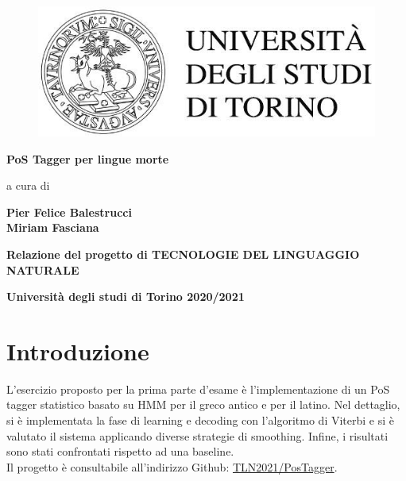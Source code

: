\documentclass[12pt]{article}
\begin{document}
\begin{figure}[h!]
\vskip1in
\begin{center}
\includegraphics[scale = 2]{fig/logo.jpg}
\end{center}
\end{figure}

\begin{center}
\large{\textbf{PoS Tagger per lingue morte}}
\end{center}

\vskip2.5cm

\begin{center}
a cura di
\end{center}

\vskip0.6cm

\begin{center}
\textbf{Pier Felice Balestrucci}\\
\textbf{Miriam Fasciana}\\
\end{center}

\vskip3.5cm
 
\begin{center}
\textbf{Relazione del progetto di TECNOLOGIE DEL LINGUAGGIO NATURALE}
\end{center}

\begin{center}
\textbf{Università degli studi di Torino 2020/2021}
\end{center}
\newpage
\begin{center}
\tableofcontents
\end{center}
\pagebreak
\section{Introduzione}
L’esercizio proposto per la prima parte d’esame è l’implementazione di un PoS tagger statistico basato su HMM per il greco antico e per il latino. Nel dettaglio, si è implementata la fase di learning e decoding con l’algoritmo di Viterbi e si è valutato il sistema applicando diverse strategie di smoothing. Infine, i risultati sono stati confrontati rispetto ad una baseline.
\\Il progetto è consultabile all'indirizzo Github: \href{https://github.com/TLN2021/PosTagger}{TLN2021/PosTagger}.
\end{document}
